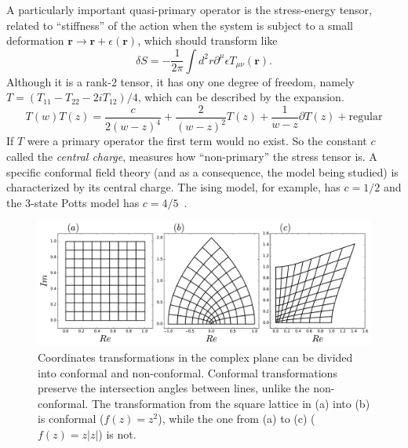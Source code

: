 A particularly important quasi-primary operator is the stress-energy tensor,
related to ``stiffness'' of the action when the system is subject to a small
deformation $\mathbf{r}\rightarrow \mathbf{r} + \epsilon(\mathbf{r})$, which
should transform like
\begin{equation}
    \delta S=
    -\frac{1}{2\pi}
    \int d^{2}r\partial^{\mu}\epsilon T_{\mu\nu}\left(\mathbf{r}\right).
\end{equation}
Although it is a rank-2 tensor, it has ony one degree of freedom, namely
$T=(T_{11}-T_{22}-2iT_{12})/4$, which can be described by the expansion.
\begin{equation}
    T\left(w\right)T\left(z\right)=
    \frac{c}{2{\left(w-z\right)}^{4}}+
    \frac{2}{{\left(w-z\right)}^{2}}T\left(z\right)+
    \frac{1}{w-z}\partial T\left(z\right)+\mbox{regular}
\end{equation}
If $T$ were a primary operator the first term would no exist. So the constant
$c$ called the \textit{central charge}, measures how ``non-primary'' the stress
tensor is. A specific conformal field theory (and as a consequence, the model
being studied) is characterized by its central charge. The ising model, for
example, has $c=1/2$ and the 3-state Potts model has
$c=4/5$~\cite{Francesco1997}.

\begin{figure}
\begin{center}
    \includegraphics[width=\textwidth]{chapters/ch3-conf/figs/cmapex}
\end{center}
\caption{Coordinates transformations in the complex plane can be divided into
    conformal and non-conformal. Conformal transformations preserve the
    intersection angles between lines, unlike the non-conformal. The
    transformation from the square lattice in (a) into (b) is conformal
    ($f(z)=z^2$), while the one from (a) to (c) ($f(z)=z|z|$) is not.}
\label{fig:cmapex}
\end{figure}


